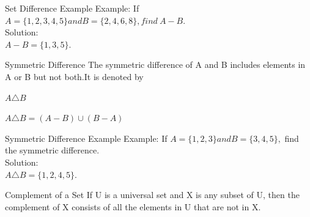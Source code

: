 \documentclass{beamer}
\begin{document}
\begin{frame}{Set Difference Example}
    Example: If  $A = \{1,2, 3, 4,5\} and B = \{2, 4, 6,8\},find\ A-B$.\\
Solution:\\
\centering
$A - B = \{1,3, 5\}.$
\end{frame}

\begin{frame}{Symmetric Difference}
    The symmetric difference of A and B includes elements in A or B but not both.It is denoted by
    \begin{center}
        $A\triangle B$
    \end{center}
    \begin{center}
        $A\triangle B=(A-B)\cup(B-A)$
    \end{center}
    \setlength{\fboxsep}{5pt}
\begin{center}
\setlength{\fboxsep}{5pt}
\end{center}

    
\end{frame}

\begin{frame}{Symmetric Difference Example}
    Example: If  $A = \{1,2, 3\} and B = \{3, 4, 5\},$ find the symmetric difference.\\
Solution:\\
\centering
$A \triangle B = \{1,2,4,5\}.$
\end{frame}

\begin{frame}{Complement of a Set}
If U is a universal set and X is any subset of U, then the complement of X consists of all the elements in U that are not in X.
\begin{center}


\end{center}
    
\end{frame}
\end{document}

